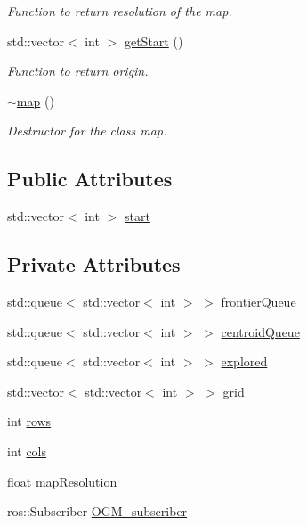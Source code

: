 \begin{DoxyCompactItemize}
\begin{DoxyCompactList}\small\item\em Function to return resolution of the map. \end{DoxyCompactList}\item 
std\+::vector$<$ int $>$ \hyperlink{classmap_a51047b6cd09491df72de1447c7c99431}{get\+Start} ()
\begin{DoxyCompactList}\small\item\em Function to return origin. \end{DoxyCompactList}\item 
\hyperlink{classmap_a0cc22df7b44f7835fa10ed241848b041}{$\sim$map} ()
\begin{DoxyCompactList}\small\item\em Destructor for the class map. \end{DoxyCompactList}\end{DoxyCompactItemize}
\subsection*{Public Attributes}
\begin{DoxyCompactItemize}
\item 
std\+::vector$<$ int $>$ \hyperlink{classmap_a73ea3c7b79de5a8b5733b7babc21e68b}{start}
\end{DoxyCompactItemize}
\subsection*{Private Attributes}
\begin{DoxyCompactItemize}
\item 
std\+::queue$<$ std\+::vector$<$ int $>$ $>$ \hyperlink{classmap_ad3683241c11549fa2888eadf3465857f}{frontier\+Queue}
\item 
std\+::queue$<$ std\+::vector$<$ int $>$ $>$ \hyperlink{classmap_a8fe868100933bfd68b502b68d42f1883}{centroid\+Queue}
\item 
std\+::queue$<$ std\+::vector$<$ int $>$ $>$ \hyperlink{classmap_ad8a2f40c1520dd9f0f5337abbf81e64f}{explored}
\item 
std\+::vector$<$ std\+::vector$<$ int $>$ $>$ \hyperlink{classmap_a43036b0bcee6beeb4e8f4dfc5019e5fb}{grid}
\item 
int \hyperlink{classmap_a2ee828fe96a115fe070e8ff8eea7b488}{rows}
\item 
int \hyperlink{classmap_ad82f9850ab232d78d0cac14c5e6a752f}{cols}
\item 
float \hyperlink{classmap_ab2c38de30b06b80ec0a6ce646056d33a}{map\+Resolution}
\item 
ros\+::\+Subscriber \hyperlink{classmap_ae40cfd9b303640dfc7a56e198056d2a0}{O\+G\+M\+\_\+subscriber}
\end{DoxyCompactItemize}


